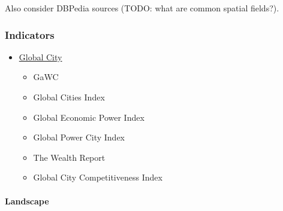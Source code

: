 \documentclass[]{article}
\begin{document}
Also consider DBPedia sources (TODO: what are common spatial fields?).

\subsubsection{Indicators}\label{indicators}

\begin{itemize}
\itemsep1pt\parskip0pt
\item
  \href{http://en.wikipedia.org/wiki/Global_City}{Global City}

  \begin{itemize}
  \itemsep1pt\parskip0pt
  \item
    GaWC
  \item
    Global Cities Index
  \item
    Global Economic Power Index
  \item
    Global Power City Index
  \item
    The Wealth Report
  \item
    Global City Competitiveness Index
  \end{itemize}
\end{itemize}

\paragraph{Landscape}\label{landscape}
\end{document}
